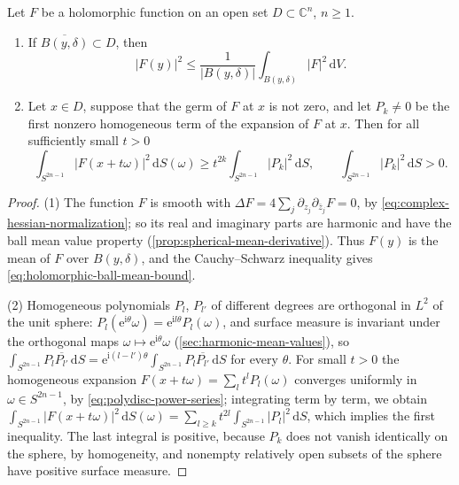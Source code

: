 \begin{lemma}\label{lem:holomorphic-mean-lowest-term}
Let $F$ be a holomorphic function on an open set $D\subset\mathbb C^n$, $n\geq1$.
\begin{enumerate}
\item If $\overline{B(y,\delta)}\subset D$, then
\begin{equation}\label{eq:holomorphic-ball-mean-bound}
 |F(y)|^2\leq\frac1{|B(y,\delta)|}\int_{B(y,\delta)}|F|^2\,\mathrm dV.
\end{equation}
\item Let $x\in D$, suppose that the germ of $F$ at $x$ is not zero, and let $P_k\neq0$ be the first nonzero homogeneous term of the expansion of $F$ at $x$. Then for all sufficiently small $t>0$
\begin{equation}\label{eq:sphere-lowest-term}
 \int_{S^{2n-1}}|F(x+t\omega)|^2\,\mathrm dS(\omega)\geq t^{2k}\int_{S^{2n-1}}|P_k|^2\,\mathrm dS,
 \qquad\int_{S^{2n-1}}|P_k|^2\,\mathrm dS>0.
\end{equation}
\end{enumerate}
\end{lemma}
\begin{proof}
(1) The function $F$ is smooth with $\Delta F=4\sum_j\partial_{z_j}\partial_{\bar z_j}F=0$, by \eqref{eq:complex-hessian-normalization}; so its real and imaginary parts are harmonic and have the ball mean value property (\cref{prop:spherical-mean-derivative}). Thus $F(y)$ is the mean of $F$ over $B(y,\delta)$, and the Cauchy--Schwarz inequality gives \eqref{eq:holomorphic-ball-mean-bound}.

(2) Homogeneous polynomials $P_l$, $P_{l'}$ of different degrees are orthogonal in $L^2$ of the unit sphere: $P_l(\mathrm e^{\mathrm i\theta}\omega)=\mathrm e^{\mathrm il\theta}P_l(\omega)$, and surface measure is invariant under the orthogonal maps $\omega\mapsto\mathrm e^{\mathrm i\theta}\omega$ (\cref{sec:harmonic-mean-values}), so $\int_{S^{2n-1}}P_l\overline{P_{l'}}\,\mathrm dS=\mathrm e^{\mathrm i(l-l')\theta}\int_{S^{2n-1}}P_l\overline{P_{l'}}\,\mathrm dS$ for every $\theta$. For small $t>0$ the homogeneous expansion $F(x+t\omega)=\sum_lt^lP_l(\omega)$ converges uniformly in $\omega\in S^{2n-1}$, by \eqref{eq:polydisc-power-series}; integrating term by term, we obtain $\int_{S^{2n-1}}|F(x+t\omega)|^2\,\mathrm dS(\omega)=\sum_{l\geq k}t^{2l}\int_{S^{2n-1}}|P_l|^2\,\mathrm dS$, which implies the first inequality. The last integral is positive, because $P_k$ does not vanish identically on the sphere, by homogeneity, and nonempty relatively open subsets of the sphere have positive surface measure.
\end{proof}

